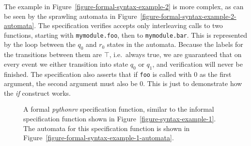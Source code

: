 The example in Figure~\ref{figure-formal-syntax-example-2} is more complex, as
can be seen by the sprawling automata in
Figure~\ref{figure-formal-syntax-example-2-automata}. The specification
verifies accepts only interleaving calls to two functions, starting with
\texttt{mymodule.foo}, then to \texttt{mymodule.bar}. This is represented by
the loop between the $q_0$ and $r_0$ states in the automata. Because the labels
for the transitions between them are $\top$, i.e.\ always true, we are
guaranteed that on every event we either transition into state $q_0$ or $q_1$,
and verification will never be finished. The specification also asserts that if
\texttt{foo} is called with $0$ as the first argument, the second argument must
also be $0$. This is just to demonstrate how the \textit{if} construct works.


\begin{figure}[h!]
	\begin{center}
	\begin{minipage}{0.9\textwidth}
	
	\end{minipage}
	\end{center}

  \caption{A formal \textit{pythonrv} specification function, similar to the
    informal specification function shown in
    Figure~\ref{figure-syntax-example-1}. The automata for this specification
    function is shown in Figure~\ref{figure-formal-syntax-example-1-automata}.}
	\label{figure-formal-syntax-example-1}
\end{figure}

